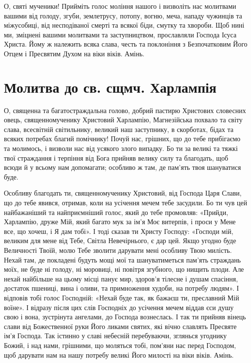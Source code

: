 \documentclass[chapters.tex]{subfiles}
\begin{document}
О, святі мученики! Прийміть голос моління нашого і визволіть нас молитвами вашими від голоду, згуби, землетрусу, потопу, вогню, меча, нападу чужинців та міжусобиці, від несподіваної смерті та всякої біди, смутку та хвороби. Щоб нині ми, зміцнені вашими молитвами та заступництвом, прославляли Господа Ісуса Христа. Йому ж належить всяка слава, честь та поклоніння з Безпочатковим Його Отцем і Пресвятим Духом на віки віків. Амінь.

\section{Молитва до св. сщмч. Харлампія}
О, священна та багатостраждальна голово, добрий пастирю Христових словесних овець, священномученику Христовий Харлампію, Магнезійська похвало та світу слава, всесвітній світильнику, великий наш заступнику, в скорботах, бідах та всяких потребах благий помічнику! Почуй нас, грішних, що до тебе прибігаємо та молимось, і визволи нас від усякого злого випадку. Бо ти за великі та тяжкі твої страждання і терпіння від Бога прийняв велику силу та благодать, щоб всюди й у всьому нам допомагати; особливо ж там, де пам’ять твоя шануватися буде.

Особливу благодать ти, священномученику Христовий, від Господа Царя Слави, що до тебе явився, отримав, коли на усічення мечем тебе засудили. Бо ти чув цей найбажаніший та найприємніший голос, який до тебе промовляв: «Прийди, Харлампію, друже Мій, який багато мук за ім’я Моє витерпів, і проси у Мене все, що хочеш, і Я дам тобі». І тоді сказав ти Христу Господу: «Господи мій, великим для мене від Тебе, Світла Невечірнього, є дар цей. Якщо угодно буде Величності Твоїй, молю Тебе зволити дарувати мені особливу Твою милість. Нехай там, де покладені будуть мощі мої та шануватиметься пам’ять страждань моїх, не буде ні голоду, ні моровиці, ні повітря згубного, що нищить плоди. Але нехай найбільше на цьому місці панує мир, здоров’я тілесне і душам спасіння, достаток пшениці, вина і оливи, та примноження худоби, на потребу людям». І відповів тобі голос Господній: «Нехай буде так, як бажаєш ти, преславний Мій воїне». І відразу після цих слів Господніх до усічення мечем віддав єси душу свою і вона, зустрінута ангелами, до Господа вознеслась. І так ти прийняв вінець слави від Божественної руки Його ликами святих, які вічно славлять Пресвяте ім’я Господа. Так істинно у славі небесній перебуваючи, зглянься угоднику Божий, і над нами, грішними, що моляться тобі, пом’яни нас перед Господом, щоб дарувати нам на нашу потребу великі Його милості на віки віків. Амінь.
\end{document}
